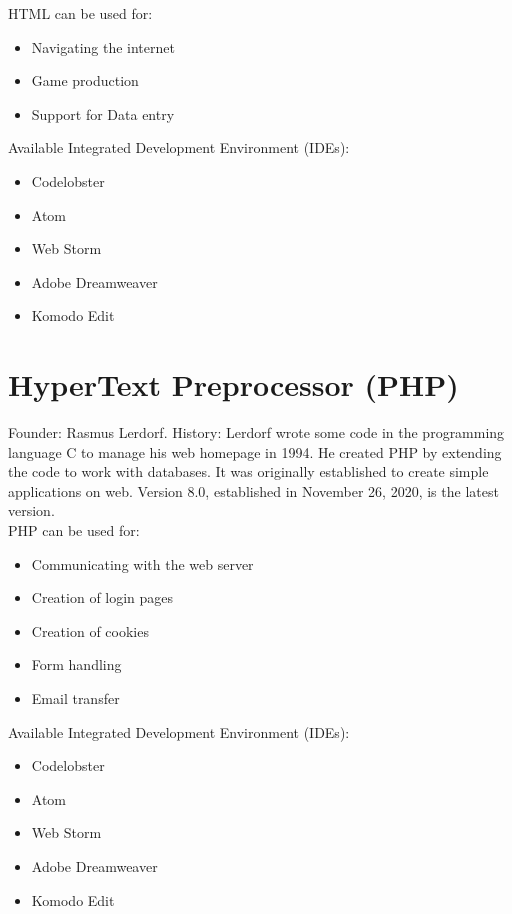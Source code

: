 \documentclass{article}
\begin{document}
   HTML can be used for:
   \begin{itemize}
	\item Navigating the internet 
	\item Game production
	\item Support for Data entry\\
   \end{itemize}    

   Available Integrated Development Environment (IDEs):
   \begin{itemize}
	\item Codelobster
	\item Atom
	\item Web Storm
	\item Adobe Dreamweaver
	\item Komodo Edit\\
   \end{itemize}


	\section{HyperText Preprocessor (PHP)}
	Founder: Rasmus Lerdorf. History:
	Lerdorf wrote some code in the programming language C to manage his web homepage in 1994.
	He created PHP by extending the code to work with databases.
	It was originally established to create simple applications on web.
	Version 8.0, established in November 26, 2020, is the latest version.\\
	
   PHP can be used for:
   \begin{itemize}
	\item Communicating with the web server
	\item Creation of login pages
	\item Creation of cookies
	\item Form handling
	\item Email transfer\\
   \end{itemize}	
	
   Available Integrated Development Environment (IDEs):
   \begin{itemize}
	\item Codelobster
	\item Atom
	\item Web Storm
	\item Adobe Dreamweaver
	\item Komodo Edit\\
   \end{itemize}
	
	
	
	
	
\end{document}
